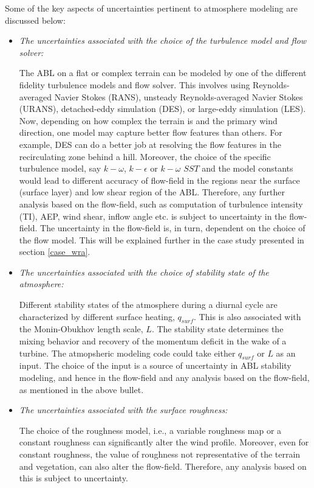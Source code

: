 \documentclass[]{aiaa-tc}%
\begin{document}
Some of the key aspects of uncertainties pertinent to atmosphere modeling are discussed below:

\begin{itemize}
  \item \textit{The uncertainties associated with the choice of the turbulence model and flow solver:}

The ABL on a flat or complex terrain can be modeled by one of the different fidelity turbulence models and flow solver. This involves using Reynolds-averaged Navier Stokes (RANS), unsteady Reynolds-averaged Navier Stokes (URANS), detached-eddy simulation (DES), or large-eddy simulation (LES). Now, depending on how complex the terrain is and the primary wind direction, one model may capture better flow features than others. For example, DES can do a better job at resolving the flow features in the recirculating zone behind a hill. Moreover, the choice of the specific turbulence model, say $k-\omega$, $k- \epsilon$ or $k - \omega$  $SST$ and the model constants would lead to different accuracy of flow-field in the regions near the surface (surface layer) and low shear region of the ABL. Therefore, any further analysis based on the flow-field, such as computation of turbulence intensity (TI), AEP, wind shear, inflow angle etc. is subject to uncertainty in the flow-field. The uncertainty in the flow-field is, in turn, dependent on the choice of the flow model. This will be explained further in the case study presented in section \ref{case_wra}.
 
 \item \textit{The uncertainties associated with the choice of stability state of the atmosphere:}

Different stability states of the atmosphere during a diurnal cycle are characterized by different surface heating, $q_{surf}$. This is also associated with the Monin-Obukhov length scale, $L$. The stability state determines the mixing behavior and recovery of the momentum deficit in the wake of a turbine. The atmopsheric modeling code could take either $q_{surf}$ or $L$ as an input. The choice of the input is a source of uncertainty in ABL stability modeling, and hence in the flow-field and any analysis based on the flow-field, as mentioned in the above bullet.  

  \item  \textit{The uncertainties associated with the surface roughness:}

The choice of the roughness model, i.e., a variable roughness map or a constant roughness can significantly alter the wind profile. Moreover, even for constant roughness, the value of roughness not representative of the terrain and vegetation, can also alter the flow-field. Therefore, any analysis based on this is subject to uncertainty.
 
\end{itemize}
\end{document}
